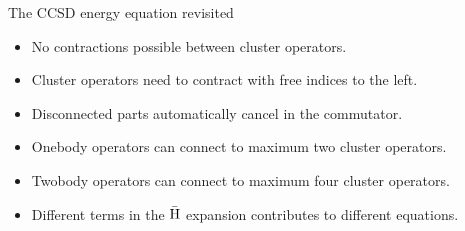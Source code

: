 \begin{frame}{The CCSD energy equation revisited }

    \begin{itemize}
        \item No contractions possible between cluster operators. \pause
        \item Cluster operators need to contract with free indices to the left. \pause
        \item Disconnected parts automatically cancel in the commutator. \pause
        \item Onebody operators can connect to maximum two cluster operators. \pause
        \item Twobody operators can connect to maximum four cluster operators. \pause
        \item Different terms in the $\bar{\mathrm{H}}$ expansion contributes to different equations.
    \end{itemize}


\end{frame}

    
